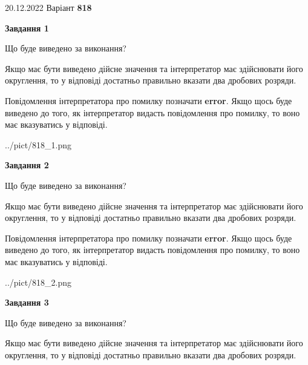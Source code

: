\documentclass[12pt, ukrainian]{article}
\begin{document}
{20.12.2022 Варіант \No \textbf { 818 }\par}
{
\begin {Large}

{\begin {center}\textbf{Завдання 1}\end {center}}\par
Що буде виведено за виконання? \par

Якщо має бути виведено дійсне значення та інтерпретатор має здійснювати його округлення, 
то у відповіді достатньо правильно вказати два дробових розряди.

Повідомлення інтерпретатора про помилку позначати \textbf{error}.
Якщо щось буде виведено до того, як інтерпретатор видасть повідомлення про помилку, 
то воно має вказуватись у відповіді. \par

\begin{center}
	{../pict/818_1.png}
\end{center}
\newpage

{\begin {center}\textbf{Завдання 2}\end {center}}\par
Що буде виведено за виконання? \par

Якщо має бути виведено дійсне значення та інтерпретатор має здійснювати його округлення, 
то у відповіді достатньо правильно вказати два дробових розряди.

Повідомлення інтерпретатора про помилку позначати \textbf{error}.
Якщо щось буде виведено до того, як інтерпретатор видасть повідомлення про помилку, 
то воно має вказуватись у відповіді. \par

\begin{center}
	{../pict/818_2.png}
\end{center}
\newpage

{\begin {center}\textbf{Завдання 3}\end {center}}\par
Що буде виведено за виконання? \par

Якщо має бути виведено дійсне значення та інтерпретатор має здійснювати його округлення, 
то у відповіді достатньо правильно вказати два дробових розряди.


\end{Large}}
\end{document}
